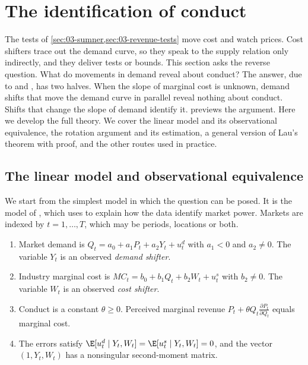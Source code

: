 \section{The identification of conduct}\label{sec:03-identification}

The tests of \cref{sec:03-sumner,sec:03-revenue-tests} move cost and watch prices. Cost shifters trace out the
demand curve, so they speak to the supply relation only indirectly, and they deliver tests or bounds. This section
asks the reverse question. What do movements in demand reveal about conduct? The answer, due to
\citet{Bresnahan1982} and \citet{Lau1982}, has two halves. When the slope of marginal cost is unknown, demand shifts
that move the demand curve in parallel reveal nothing about conduct. Shifts that change the slope of demand identify it.  previews the
argument. Here we develop the full theory. We cover the linear model and its observational equivalence, the rotation
argument and its estimation, a general version of Lau's theorem with proof, and the other routes used in practice.

\subsection{The linear model and observational equivalence}\label{sec:03-obs-equiv}

We start from the simplest model in which the question can be posed. It is the model of \citet{Bresnahan1982}, which
\citet[Section~3.1]{Bresnahan1989} uses to explain how the data identify market power. Markets are indexed by
$t = 1, \dots, T$, which may be periods, locations or both.

\begin{assumption}\label{ass:03-linear}
\leavevmode
\begin{enumerate}[label=(\roman*)]
\item Market demand is $Q_t = a_0 + a_1 P_t + a_2 Y_t + u^d_t$ with $a_1 < 0$ and $a_2 \neq 0$. The variable $Y_t$ is
  an observed \emph{demand shifter}.
\item Industry marginal cost is $MC_t = b_0 + b_1 Q_t + b_2 W_t + u^s_t$ with $b_2 \neq 0$. The variable $W_t$ is an
  observed \emph{cost shifter}.
\item Conduct is a constant $\theta \ge 0$. Perceived marginal revenue $P_t + \theta Q_t \frac{\partial P_t}{\partial
  Q_t}$ equals marginal cost.
\item The errors satisfy $\E[u^d_t \mid Y_t, W_t] = \E[u^s_t \mid Y_t, W_t] = 0$, and the vector $(1, Y_t, W_t)$ has a
  nonsingular second-moment matrix.
\end{enumerate}
\end{assumption}

